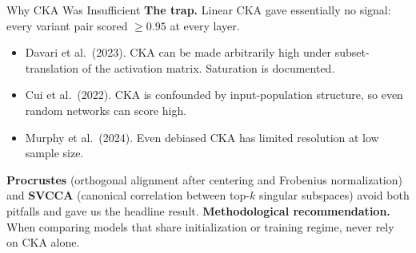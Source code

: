 \documentclass{beamer}
\begin{document}
\begin{frame}{Why CKA Was Insufficient}
\footnotesize
\textbf{The trap.} Linear CKA gave essentially no signal: every variant pair scored $\geq 0.95$ at every layer.
\vfill
\begin{itemize}\setlength\itemsep{2pt}
  \item Davari et al.\ (2023). CKA can be made arbitrarily high under subset-translation of the activation matrix. Saturation is documented.
  \item Cui et al.\ (2022). CKA is confounded by input-population structure, so even random networks can score high.
  \item Murphy et al.\ (2024). Even debiased CKA has limited resolution at low sample size.
\end{itemize}
\vfill
\textbf{Procrustes} (orthogonal alignment after centering and Frobenius normalization) and \textbf{SVCCA} (canonical correlation between top-$k$ singular subspaces) avoid both pitfalls and gave us the headline result.
\vfill
\textbf{Methodological recommendation.} When comparing models that share initialization or training regime, never rely on CKA alone.
\end{frame}
\end{document}
